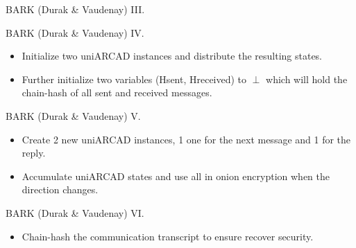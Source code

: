 \documentclass{beamer}
\begin{document}
\begin{frame}{BARK (Durak \& Vaudenay) III.}
   \begin{figure}[h]
     \centering
     \setlength{\fboxsep}{10pt}
     \scalebox{0.7}{%
       \fbox{%
          
       }
     }
  \end{figure}
\end{frame}

\begin{frame}{BARK (Durak \& Vaudenay) IV.}
   \scriptsize
  \begin{minipage}[h]{0.49\textwidth}
      \begin{figure}[ht]
        \centering
        \setlength{\fboxsep}{10pt}
        \scalebox{0.7}{%
        \fbox{%
          
        }
      }
    \end{figure}
    \end{minipage}
  \begin{minipage}[h]{0.49\textwidth}
      \begin{itemize}
      \item Initialize two uniARCAD instances and distribute the
        resulting states.
      \item Further initialize two variables (Hsent, Hreceived) to $\perp$ which will
        hold the chain-hash of all sent and received messages.
      \end{itemize}
    \end{minipage}
  \end{frame}

\begin{frame}{BARK (Durak \& Vaudenay) V.}
  \scriptsize
  \begin{figure}[ht]
     \centering
     \setlength{\fboxsep}{10pt}
     \scalebox{0.6}{%
       \fbox{%
         
       }
     }
  \end{figure}
  \begin{itemize}
  \item Create 2 new uniARCAD instances, 1 one for the next message and 1
    for the reply.
  \item Accumulate uniARCAD states and use all in onion encryption when
    the direction changes.
  \end{itemize}
\end{frame}

\begin{frame}{BARK (Durak \& Vaudenay) VI.}
  \scriptsize
  \begin{figure}[ht]
     \centering
     \setlength{\fboxsep}{10pt}
     \scalebox{0.6}{%
       \fbox{%
         
       }
     }
  \end{figure}
  \begin{itemize}
  \item Chain-hash the communication transcript to ensure recover security.
  \end{itemize}
\end{frame}
\end{document}
